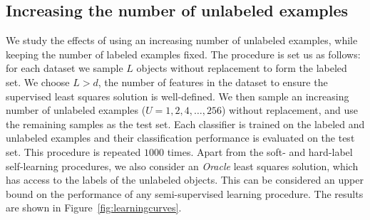 \documentclass[conference,a4paper,10pt]{IEEEtran}\usepackage[]{graphicx}\usepackage[]{color}
\begin{document}
\subsection{Increasing the number of unlabeled examples}
We study the effects of using an increasing number of unlabeled examples, while keeping the number of labeled examples fixed. The procedure is set us as follows: for each dataset we sample $L$ objects without replacement to form the labeled set. We choose $L>d$, the number of features in the dataset to ensure the supervised least squares solution is well-defined. We then sample an increasing number of unlabeled examples ($U=1,2,4,\dots,256$) without replacement, and use the remaining samples as the test set. Each classifier is trained on the labeled and unlabeled examples and their classification performance is evaluated on the test set. This procedure is repeated $1000$ times. Apart from the soft- and hard-label self-learning procedures, we also consider an \emph{Oracle} least squares solution, which has access to the labels of the unlabeled objects. This can be considered an upper bound on the performance of any semi-supervised learning procedure. The results are shown in Figure~\ref{fig:learningcurves}.
\end{document}
